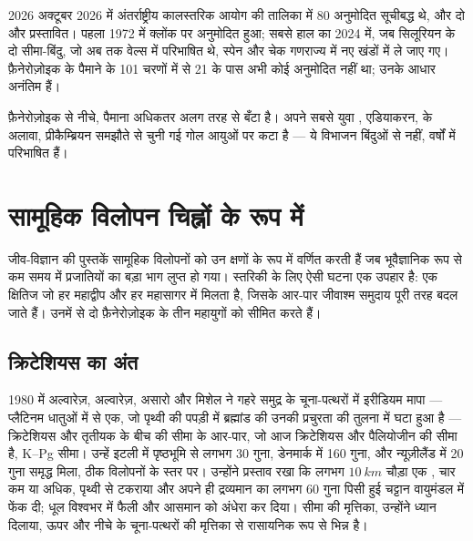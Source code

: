 \begin{dated}{2026}
अक्टूबर 2026 में अंतर्राष्ट्रीय कालस्तरिक आयोग की तालिका में 80 अनुमोदित  सूचीबद्ध थे, और दो और प्रस्तावित। पहला 1972 में क्लोंक पर अनुमोदित हुआ; सबसे हाल का 2024 में, जब सिलूरियन के दो सीमा-बिंदु, जो अब तक वेल्स में परिभाषित थे, स्पेन और चेक गणराज्य में नए खंडों में ले जाए गए। फ़ैनेरोज़ोइक के पैमाने के 101 चरणों में से 21 के पास अभी कोई अनुमोदित  नहीं था; उनके आधार अनंतिम हैं।
\end{dated}

फ़ैनेरोज़ोइक से नीचे, पैमाना अधिकतर अलग तरह से बँटा है। अपने सबसे युवा , एडियाकरन, के अलावा, प्रीकैम्ब्रियन समझौते से चुनी गई गोल आयुओं पर कटा है --- ये विभाजन बिंदुओं से नहीं, वर्षों में परिभाषित हैं।

\section{सामूहिक विलोपन चिह्नों के रूप में}\label{sec:b1:stratigraphic-scale:extinctions}

जीव-विज्ञान की पुस्तकें सामूहिक विलोपनों को उन क्षणों के रूप में वर्णित करती हैं जब भूवैज्ञानिक रूप से कम समय में प्रजातियों का बड़ा भाग लुप्त हो गया। स्तरिकी के लिए ऐसी घटना एक उपहार है: एक क्षितिज जो हर महाद्वीप और हर महासागर में मिलता है, जिसके आर-पार जीवाश्म समुदाय पूरी तरह बदल जाते हैं। उनमें से दो फ़ैनेरोज़ोइक के तीन महायुगों को सीमित करते हैं।

\subsection*{क्रिटेशियस का अंत}

1980 में अल्वारेज़, अल्वारेज़, असारो और मिशेल ने गहरे समुद्र के चूना-पत्थरों में इरीडियम मापा --- प्लैटिनम धातुओं में से एक, जो पृथ्वी की पपड़ी में ब्रह्मांड की उनकी प्रचुरता की तुलना में घटा हुआ है --- क्रिटेशियस और तृतीयक के बीच की सीमा के आर-पार, जो आज क्रिटेशियस और पैलियोजीन की सीमा है, K--Pg सीमा। उन्हें इटली में पृष्ठभूमि से लगभग 30 गुना, डेनमार्क में 160 गुना, और न्यूज़ीलैंड में 20 गुना समृद्ध मिला, ठीक विलोपनों के स्तर पर। उन्होंने प्रस्ताव रखा कि लगभग $\qty{10}{km}$ चौड़ा एक , चार कम या अधिक, पृथ्वी से टकराया और अपने ही द्रव्यमान का लगभग 60 गुना पिसी हुई चट्टान वायुमंडल में फेंक दी; धूल विश्वभर में फैली और आसमान को अंधेरा कर दिया। सीमा की मृत्तिका, उन्होंने ध्यान दिलाया, ऊपर और नीचे के चूना-पत्थरों की मृत्तिका से रासायनिक रूप से भिन्न है।

